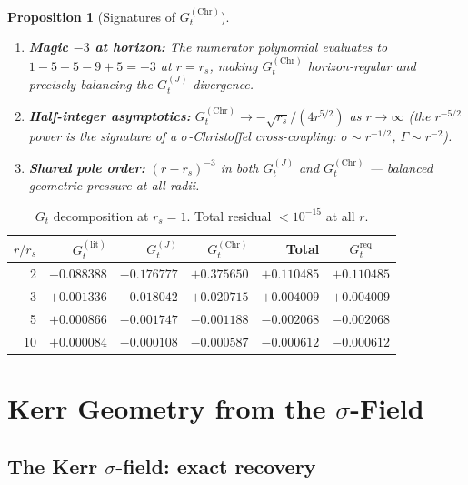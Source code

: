 \documentclass[11pt,a4paper]{article}
\theoremstyle{plain}
\newtheorem{proposition}[theorem]{Proposition}
\theoremstyle{definition}
\theoremstyle{remark}
\begin{document}
\begin{proposition}[Signatures of $G_t^{(\mathrm{Chr})}$]\label{prop:Chr_props}
\begin{enumerate}[noitemsep,label=\rm(\roman*)]
  \item \textbf{Magic $-3$ at horizon:}
    The numerator polynomial evaluates to $1-5+5-9+5 = -3$ at $r=r_s$,
    making $G_t^{(\mathrm{Chr})}$ horizon-regular and precisely balancing
    the $G_t^{(J)}$ divergence.
  \item \textbf{Half-integer asymptotics:}
    $G_t^{(\mathrm{Chr})} \to -\sqrt{r_s}/(4r^{5/2})$ as $r\to\infty$
    (the $r^{-5/2}$ power is the signature of a $\sigma$-Christoffel
    cross-coupling: $\sigma\sim r^{-1/2}$, $\Gamma\sim r^{-2}$).
  \item \textbf{Shared pole order:}
    $(r-r_s)^{-3}$ in both $G_t^{(J)}$ and $G_t^{(\mathrm{Chr})}$
    --- balanced geometric pressure at all radii.
\end{enumerate}
\end{proposition}

\begin{table}[h]
\centering\small\renewcommand{\arraystretch}{1.25}
\caption{$G_t$ decomposition at $r_s=1$. Total residual $<10^{-15}$ at all $r$.}
\label{tab:Gt}
\begin{tabular}{@{}rrrrrc@{}}
\toprule
$r/r_s$ & $G_t^{(\mathrm{lit})}$ & $G_t^{(J)}$ & $G_t^{(\mathrm{Chr})}$ &
  Total & $G_t^{\mathrm{req}}$ \\
\midrule
2  & $-0.088388$ & $-0.176777$ & $+0.375650$ & $+0.110485$ & $+0.110485$ \\
3  & $+0.001336$ & $-0.018042$ & $+0.020715$ & $+0.004009$ & $+0.004009$ \\
5  & $+0.000866$ & $-0.001747$ & $-0.001188$ & $-0.002068$ & $-0.002068$ \\
10 & $+0.000084$ & $-0.000108$ & $-0.000587$ & $-0.000612$ & $-0.000612$ \\
\bottomrule
\end{tabular}
\end{table}

\section{Kerr Geometry from the $\sigma$-Field}
\label{sec:Kerr}

\subsection{The Kerr $\sigma$-field: exact recovery}
\end{document}
